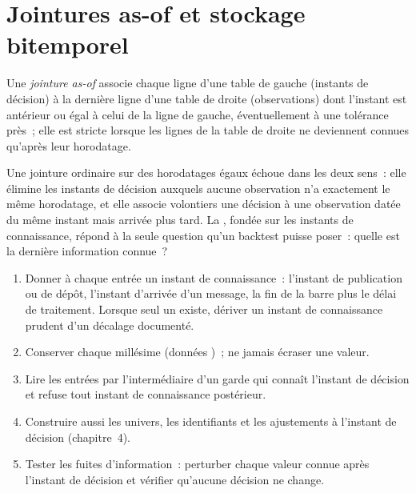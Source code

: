 \section{Jointures as-of et stockage bitemporel}

\begin{definition}[Jointure as-of]\label{def:rs:point-in-time-data-and-the-biases:asof}
Une \emph{jointure as-of} associe chaque ligne d'une table de gauche (instants de décision) à la dernière ligne d'une table de droite
(observations) dont l'instant est antérieur ou égal à celui de la ligne de gauche, éventuellement à une tolérance près~; elle est stricte
lorsque les lignes de la table de droite ne deviennent connues qu'après leur horodatage.
\end{definition}

Une jointure ordinaire sur des horodatages égaux échoue dans les deux sens~: elle élimine les instants de décision auxquels aucune observation
n'a exactement le même horodatage, et elle associe volontiers une décision à une observation datée du même instant mais arrivée plus tard.
La , fondée sur les instants de connaissance, répond à la seule question qu'un backtest puisse poser~: quelle est la dernière information connue~?

\begin{method}\label{met:rs:point-in-time-data-and-the-biases:pit}
\begin{enumerate}
\item Donner à chaque entrée un instant de connaissance~: l'instant de publication ou de dépôt, l'instant d'arrivée d'un message, la fin de la barre plus le
délai de traitement. Lorsque seul un  existe, dériver un instant de connaissance prudent d'un décalage documenté.
\item Conserver chaque millésime (données )~; ne jamais écraser une valeur.
\item Lire les entrées par l'intermédiaire d'un garde qui connaît l'instant de décision et refuse tout instant de connaissance postérieur.
\item Construire aussi les univers, les identifiants et les ajustements à l'instant de décision (chapitre~4).
\item Tester les fuites d'information~: perturber chaque valeur connue après l'instant de décision et vérifier qu'aucune décision ne change.
\end{enumerate}
\end{method}

